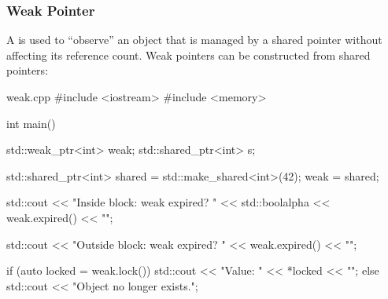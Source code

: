 \documentclass[12pt]{article}
\begin{document}
\subsubsection{Weak Pointer}

\noindent
A  is used to ``observe'' an object that is managed by a shared pointer without affecting its reference count.
Weak pointers can be constructed from shared pointers:

\begin{cxx}{weak.cpp}
#include <iostream>
#include <memory>

int main()
{
    std::weak_ptr<int> weak;
	std::shared_ptr<int> s;

    {
        std::shared_ptr<int> shared = std::make_shared<int>(42);
        weak = shared;

        std::cout << "Inside block: weak expired? " 
                  << std::boolalpha << weak.expired() << "\n";
    }

    std::cout << "Outside block: weak expired? " 
              << weak.expired() << "\n";

    if (auto locked = weak.lock())
	{
        std::cout << "Value: " << *locked << "\n";
    } else
	{
        std::cout << "Object no longer exists.\n";
    }
}
\end{cxx}
\end{document}
